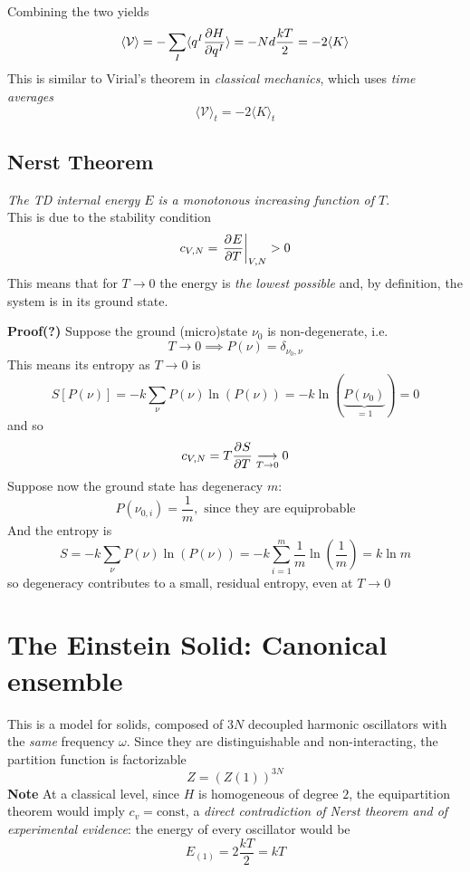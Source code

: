 
Combining the two yields
\[
    \langle \mathcal{V}\rangle = - \sum_{I}^{} \langle q^I\pdv{H}{q^I}\rangle =
    -Nd\frac{kT}{2} = -2 \langle K\rangle
\]
This is similar to Virial's theorem in \textit{classical mechanics},
which uses \textit{time averages}
\[
    \langle \mathcal{V}\rangle_t = -2 \langle K\rangle_t
\]
\subsection{Nerst Theorem}
\textit{The TD internal energy $E$ is a monotonous increasing function of $T$}.\\
This is due to the stability condition
\[
c_{V,N} = \eval{\pdv[]{E}{T}}_{V,N} > 0
\]
This means that for $T\to0$ the energy is \textit{the lowest possible} and, by
definition, the system is in its ground state.

\textbf{Proof(?)} Suppose the ground (micro)state $\nu_0$ is non-degenerate, i.e.
\[
    T\to 0 \implies P(\nu) = \delta_{\nu_0,\nu}
\]
This means its entropy as $T\to 0$ is
\[
    S[P(\nu)] = -k\sum_{\nu}^{} P(\nu)\ln(P(\nu)) = -k\ln(\underbrace{P(\nu_0)}_{
    =1}) = 0
\]
and so
\[
    c_{V,N} = T\pdv[]{S}{T}\underset{T\to0}\longrightarrow 0
\]
Suppose now the ground state has degeneracy $m$:
\[
    P(\nu_{0,i}) = \frac{1}{m},\text{ since they are equiprobable}
\]
And the entropy is
\[
    S = -k\sum_{\nu}^{} P(\nu)\ln(P(\nu)) = -k\sum_{i=1}^{m} \frac{1}{m} \ln\left(
    \frac{1}{m}\right) = k\ln m
\]
so degeneracy contributes to a small, residual entropy, even at $T\to0$ 

\section{The Einstein Solid: Canonical ensemble}
This is a model for solids, composed of $3N$ decoupled harmonic oscillators
with the \textit{same} frequency $\omega $. Since they are distinguishable and
non-interacting, the partition function is factorizable
\[
    Z = (Z(1))^{3N}
\]
\textbf{Note} At a classical level, since $H$ is homogeneous of degree $2$, the
equipartition theorem would imply $c_v=\text{const}$, a \textit{direct
contradiction of Nerst theorem and of experimental evidence}:
the energy of every oscillator would be
\[
    E_{(1)}=2\frac{kT}{2} = kT
\]

